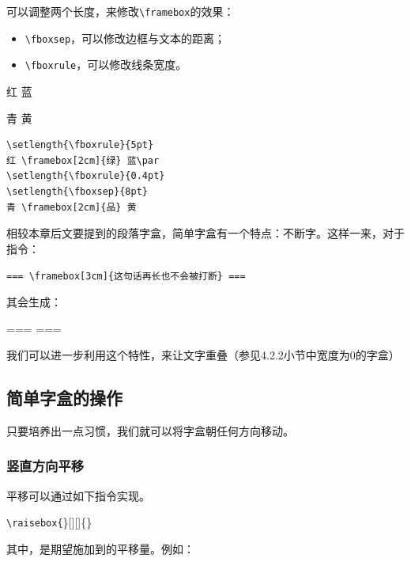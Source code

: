 可以调整两个长度，来修改\verb|\framebox|的效果：

\begin{itemize}
  \item \verb|\fboxsep|，可以修改边框与文本的距离；
  \item \verb|\fboxrule|，可以修改线条宽度。
\end{itemize}

\begin{codelist}[4.11]{
  \setlength{\fboxrule}{5pt}
红  蓝\par
\setlength{\fboxrule}{0.4pt}
\setlength{\fboxsep}{8pt}
青  黄
}\begin{verbatim}
\setlength{\fboxrule}{5pt}
红 \framebox[2cm]{绿} 蓝\par
\setlength{\fboxrule}{0.4pt}
\setlength{\fboxsep}{8pt}
青 \framebox[2cm]{品} 黄
\end{verbatim}
\end{codelist}

\begin{exclamation}
  相较本章后文要提到的段落字盒，简单字盒有一个特点：不断字。这样一来，对于指令：

  \verb|=== \framebox[3cm]{这句话再长也不会被打断} ===|

  其会生成：

  ===  ===

  我们可以进一步利用这个特性，来让文字重叠（参见4.2.2小节中宽度为0的字盒）
\end{exclamation}

\subsection{简单字盒的操作}

只要培养出一点习惯，我们就可以将字盒朝任何方向移动。

\subsubsection{竖直方向平移}

平移可以通过如下指令实现。

\begin{dmd}
\verb|\raisebox{|\}[][]\{\}
\end{dmd}

其中，是期望施加到的平移量。例如：

